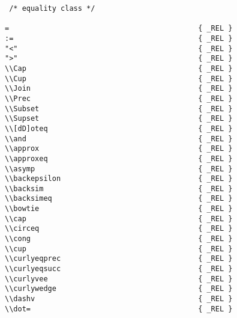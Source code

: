 \begin{verbatim}
 /* equality class */

=                                            { _REL }
:=                                           { _REL }
"<"                                          { _REL }
">"                                          { _REL }
\\Cap                                        { _REL }
\\Cup                                        { _REL }
\\Join                                       { _REL }
\\Prec                                       { _REL }
\\Subset                                     { _REL }
\\Supset                                     { _REL }
\\[dD]oteq                                   { _REL }
\\and                                        { _REL } 
\\approx                                     { _REL }
\\approxeq                                   { _REL }
\\asymp                                      { _REL }
\\backepsilon                                { _REL }
\\backsim                                    { _REL }
\\backsimeq                                  { _REL }
\\bowtie                                     { _REL }
\\cap                                        { _REL }
\\circeq                                     { _REL }
\\cong                                       { _REL }
\\cup                                        { _REL }
\\curlyeqprec                                { _REL }
\\curlyeqsucc                                { _REL }
\\curlyvee                                   { _REL }
\\curlywedge                                 { _REL }
\\dashv                                      { _REL }
\\dot=                                       { _REL }

\end{verbatim}
